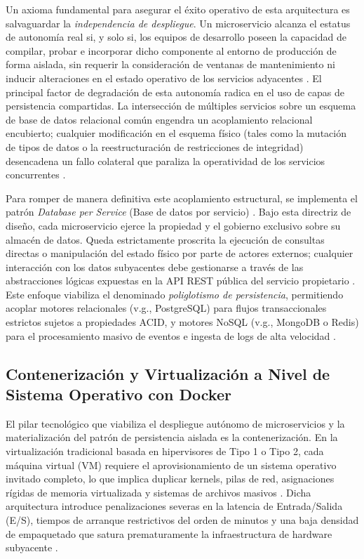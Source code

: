 \documentclass[12pt,journal,onecolumn]{IEEEtran}
\begin{document}
Un axioma fundamental para asegurar el éxito operativo de esta arquitectura es salvaguardar la \textit{independencia de despliegue}. Un microservicio alcanza el estatus de autonomía real si, y solo si, los equipos de desarrollo poseen la capacidad de compilar, probar e incorporar dicho componente al entorno de producción de forma aislada, sin requerir la consideración de ventanas de mantenimiento ni inducir alteraciones en el estado operativo de los servicios adyacentes \cite{newman2021}. El principal factor de degradación de esta autonomía radica en el uso de capas de persistencia compartidas. La intersección de múltiples servicios sobre un esquema de base de datos relacional común engendra un acoplamiento relacional encubierto; cualquier modificación en el esquema físico (tales como la mutación de tipos de datos o la reestructuración de restricciones de integridad) desencadena un fallo colateral que paraliza la operatividad de los servicios concurrentes \cite{richardson2018}.

Para romper de manera definitiva este acoplamiento estructural, se implementa el patrón \textit{Database per Service} (Base de datos por servicio) \cite{richardson2018}. Bajo esta directriz de diseño, cada microservicio ejerce la propiedad y el gobierno exclusivo sobre su almacén de datos. Queda estrictamente proscrita la ejecución de consultas directas o manipulación del estado físico por parte de actores externos; cualquier interacción con los datos subyacentes debe gestionarse a través de las abstracciones lógicas expuestas en la API REST pública del servicio propietario \cite{newman2021, richardson2018}. Este enfoque viabiliza el denominado \textit{poliglotismo de persistencia}, permitiendo acoplar motores relacionales (v.g., PostgreSQL) para flujos transaccionales estrictos sujetos a propiedades ACID, y motores NoSQL (v.g., MongoDB o Redis) para el procesamiento masivo de eventos e ingesta de logs de alta velocidad \cite{richardson2018}.

\subsection{\textbf{Contenerización y Virtualización a Nivel de Sistema Operativo con Docker}}
El pilar tecnológico que viabiliza el despliegue autónomo de microservicios y la materialización del patrón de persistencia aislada es la contenerización. En la virtualización tradicional basada en hipervisores de Tipo 1 o Tipo 2, cada máquina virtual (VM) requiere el aprovisionamiento de un sistema operativo invitado completo, lo que implica duplicar kernels, pilas de red, asignaciones rígidas de memoria virtualizada y sistemas de archivos masivos \cite{sultan2019}. Dicha arquitectura introduce penalizaciones severas en la latencia de Entrada/Salida (E/S), tiempos de arranque restrictivos del orden de minutos y una baja densidad de empaquetado que satura prematuramente la infraestructura de hardware subyacente \cite{burns2025}.
\end{document}
